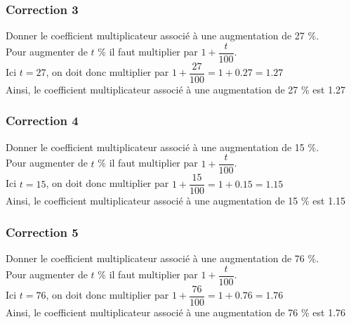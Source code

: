 \documentclass[15pt, mathserif]{beamer}
\begin{document}
\begin{frame}
\vspace{-10mm}
	\frametitle{Correction 3}
Donner le coefficient multiplicateur associé à une augmentation de 27 \%. \\ \bigskip 
 Pour augmenter de $t$ \%  il faut multiplier par $1+\dfrac{t}{100}$. \\ \bigskip Ici $t=27$, on doit donc multiplier par  $1+\dfrac{27}{100}=1+0.27=1.27$ \\ \bigskip Ainsi, le coefficient multiplicateur associé à une augmentation de 27 \% est 1.27\end{frame}


\begin{frame}
\vspace{-10mm}
	\frametitle{Correction 4}
Donner le coefficient multiplicateur associé à une augmentation de 15 \%. \\ \bigskip 
 Pour augmenter de $t$ \%  il faut multiplier par $1+\dfrac{t}{100}$. \\ \bigskip Ici $t=15$, on doit donc multiplier par  $1+\dfrac{15}{100}=1+0.15=1.15$ \\ \bigskip Ainsi, le coefficient multiplicateur associé à une augmentation de 15 \% est 1.15\end{frame}


\begin{frame}
\vspace{-10mm}
	\frametitle{Correction 5}
Donner le coefficient multiplicateur associé à une augmentation de 76 \%. \\ \bigskip 
 Pour augmenter de $t$ \%  il faut multiplier par $1+\dfrac{t}{100}$. \\ \bigskip Ici $t=76$, on doit donc multiplier par  $1+\dfrac{76}{100}=1+0.76=1.76$ \\ \bigskip Ainsi, le coefficient multiplicateur associé à une augmentation de 76 \% est 1.76\end{frame}
\end{document}

